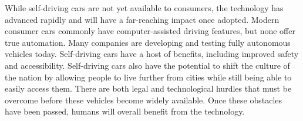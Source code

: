 \documentclass{mla}
\begin{document}
While self-driving cars are not yet available to consumers, the technology has advanced rapidly and will have a far-reaching impact once adopted. Modern consumer cars commonly have computer-assisted driving features, but none offer true automation. Many companies are developing and testing fully autonomous vehicles today. Self-driving cars have a host of benefits, including improved safety and accessibility. Self-driving cars also have the potential to shift the culture of the nation by allowing people to live further from cities while still being able to easily access them. There are both legal and technological hurdles that must be overcome before these vehicles become widely available. Once these obstacles have been passed, humans will overall benefit from the technology.

\makeworkscited
\end{document}
